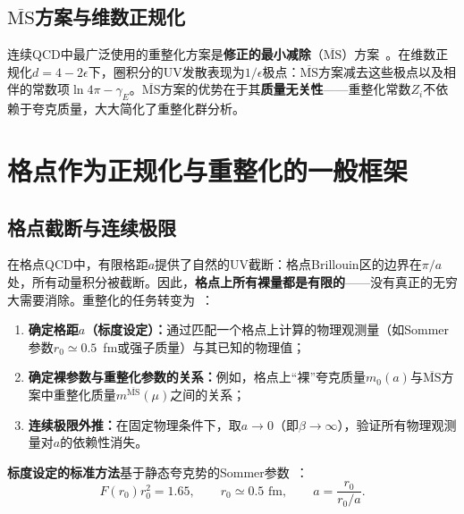 \documentclass[12pt,a4paper]{ctexart}
\theoremstyle{definition}
\begin{document}
\subsection{$\overline{\text{MS}}$方案与维数正规化}

连续QCD中最广泛使用的重整化方案是\textbf{修正的最小减除}（$\overline{\text{MS}}$）方案~\cite{PeskinSchroeder1995}。在维数正规化$d=4-2\epsilon$下，圈积分的UV发散表现为$1/\epsilon$极点：$\overline{\text{MS}}$方案减去这些极点以及相伴的常数项$\ln 4\pi - \gamma_E$。$\overline{\text{MS}}$方案的优势在于其\textbf{质量无关性}——重整化常数$Z_i$不依赖于夸克质量，大大简化了重整化群分析。

\section{格点作为正规化与重整化的一般框架}

\subsection{格点截断与连续极限}

在格点QCD中，有限格距$a$提供了自然的UV截断：格点Brillouin区的边界在$\pi/a$处，所有动量积分被截断。因此，\textbf{格点上所有裸量都是有限的}——没有真正的无穷大需要消除。重整化的任务转变为~\cite{GattringerLang2010,Gupta1997intro}：

\begin{enumerate}[leftmargin=*]
    \item \textbf{确定格距$a$（标度设定）：}通过匹配一个格点上计算的物理观测量（如Sommer参数$r_0 \simeq 0.5$~fm或强子质量）与其已知的物理值；
    \item \textbf{确定裸参数与重整化参数的关系：}例如，格点上``裸''夸克质量$m_0(a)$与$\overline{\text{MS}}$方案中重整化质量$m^{\overline{\text{MS}}}(\mu)$之间的关系；
    \item \textbf{连续极限外推：}在固定物理条件下，取$a \to 0$（即$\beta \to \infty$），验证所有物理观测量对$a$的依赖性消失。
\end{enumerate}

\textbf{标度设定的标准方法}基于静态夸克势的Sommer参数~\cite{GattringerLang2010}：
\begin{equation}
F(r_0) r_0^2 = 1.65, \qquad r_0 \simeq 0.5\text{~fm}, \qquad a = \frac{r_0}{r_0/a}.
\label{eq:sommer_scale}
\end{equation}
\end{document}
